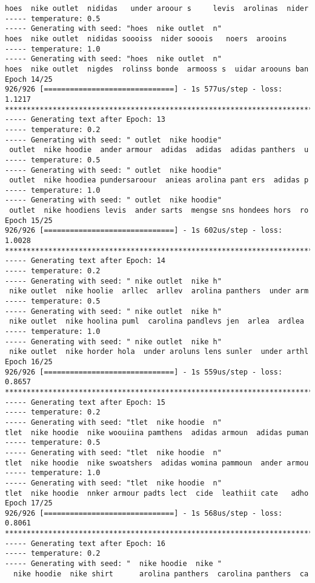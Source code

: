 \documentclass[11pt]{article}
\begin{document}
\begin{Verbatim}[commandchars=\\\{\}]
hoes  nike outlet  nididas   under aroour s     levis  arolinas  nider
----- temperature: 0.5
----- Generating with seed: "hoes  nike outlet  n"
hoes  nike outlet  nididas soooiss  nider sooois   noers  arooins
----- temperature: 1.0
----- Generating with seed: "hoes  nike outlet  n"
hoes  nike outlet  nigdes  rolinss bonde  armooss s  uidar aroouns ban
Epoch 14/25
926/926 [==============================] - 1s 577us/step - loss: 1.1217
****************************************************************************
----- Generating text after Epoch: 13
----- temperature: 0.2
----- Generating with seed: " outlet  nike hoodie"
 outlet  nike hoodie  ander armour  adidas  adidas  adidas panthers  u
----- temperature: 0.5
----- Generating with seed: " outlet  nike hoodie"
 outlet  nike hoodiea pundersaroour  anieas arolina pant ers  adidas p
----- temperature: 1.0
----- Generating with seed: " outlet  nike hoodie"
 outlet  nike hoodiens levis  ander sarts  mengse sns hondees hors  ro
Epoch 15/25
926/926 [==============================] - 1s 602us/step - loss: 1.0028
****************************************************************************
----- Generating text after Epoch: 14
----- temperature: 0.2
----- Generating with seed: " nike outlet  nike h"
 nike outlet  nike hoolie  arllec  arllev  arolina panthers  under arm
----- temperature: 0.5
----- Generating with seed: " nike outlet  nike h"
 nike outlet  nike hoolina puml  carolina pandlevs jen  arlea  ardlea
----- temperature: 1.0
----- Generating with seed: " nike outlet  nike h"
 nike outlet  nike horder hola  under aroluns lens sunler  under arthl
Epoch 16/25
926/926 [==============================] - 1s 559us/step - loss: 0.8657
****************************************************************************
----- Generating text after Epoch: 15
----- temperature: 0.2
----- Generating with seed: "tlet  nike hoodie  n"
tlet  nike hoodie  nike woouiina pamthens  adidas armoun  adidas puman
----- temperature: 0.5
----- Generating with seed: "tlet  nike hoodie  n"
tlet  nike hoodie  nike swoatshers  adidas womina pammoun  ander armou
----- temperature: 1.0
----- Generating with seed: "tlet  nike hoodie  n"
tlet  nike hoodie  nnker armour padts lect  cide  leathiit cate   adho
Epoch 17/25
926/926 [==============================] - 1s 568us/step - loss: 0.8061
****************************************************************************
----- Generating text after Epoch: 16
----- temperature: 0.2
----- Generating with seed: "  nike hoodie  nike "
  nike hoodie  nike shirt      arolina panthers  carolina panthers  ca

\end{Verbatim}
\end{document}
